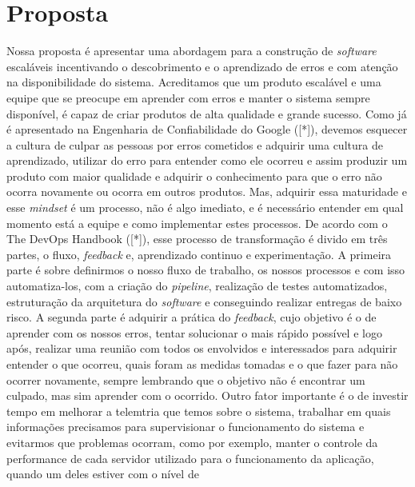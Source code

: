 \chapter{Proposta}

  Nossa proposta é apresentar uma abordagem para a construção de \textit{software}
  escaláveis incentivando o descobrimento e o aprendizado de erros e com atenção na
  disponibilidade do sistema. Acreditamos que um produto escalável e uma equipe
  que se preocupe em aprender com erros e manter o sistema sempre disponível,
  é capaz de criar produtos de alta qualidade e grande sucesso. \newline
  Como já é apresentado na Engenharia de Confiabilidade do Google ([*]), devemos
  esquecer a cultura de culpar as pessoas por erros cometidos e adquirir uma
  cultura de aprendizado, utilizar do erro para entender como ele ocorreu e assim
  produzir um produto com maior qualidade e adquirir o conhecimento para que o
  erro não ocorra novamente ou ocorra em outros produtos. Mas, adquirir essa
  maturidade e esse \textit{mindset} é um processo, não é algo imediato, e é
  necessário entender em qual momento está a equipe e como implementar estes
  processos. \newline
  De acordo com o The DevOps Handbook ([*]), esse processo de transformação é
  divido em três partes, o fluxo, \textit{feedback} e, aprendizado continuo e
  experimentação. A primeira parte é sobre definirmos o nosso fluxo de trabalho,
  os nossos processos e com isso automatiza-los, com a criação do \textit{pipeline},
  realização de testes automatizados, estruturação da arquitetura do \textit{software}
  e conseguindo realizar entregas de baixo risco. A segunda parte é adquirir a
  prática do \textit{feedback}, cujo objetivo é o de aprender com os nossos erros,
  tentar solucionar o mais rápido possível e logo após, realizar uma reunião com
  todos os envolvidos e interessados para adquirir entender o que ocorreu, quais
  foram as medidas tomadas e o que fazer para não ocorrer novamente, sempre
  lembrando que o objetivo não é encontrar um culpado, mas sim aprender com o
  ocorrido. Outro fator importante é o de investir tempo em melhorar a telemtria
  que temos sobre o sistema, trabalhar em quais informações precisamos para
  supervisionar o funcionamento do sistema e evitarmos que problemas ocorram,
  como por exemplo, manter o controle da performance de cada servidor utilizado
  para o funcionamento da aplicação, quando um deles estiver com o nível de
